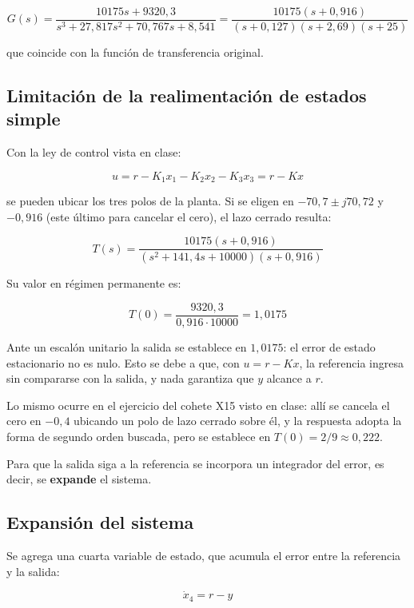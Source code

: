 \documentclass[12pt,a4paper]{article}
\begin{document}
\begin{equation}G(s)=\frac{10175s+9320{,}3}{s^3+27{,}817s^2+70{,}767s+8{,}541}=\frac{10175(s+0{,}916)}{(s+0{,}127)(s+2{,}69)(s+25)}\end{equation}

que coincide con la función de transferencia original.
\subsection*{Limitación de la realimentación de estados simple}
Con la ley de control vista en clase:

\begin{equation}u=r-K_1x_1-K_2x_2-K_3x_3=r-Kx\end{equation}

se pueden ubicar los tres polos de la planta. Si se eligen en $-70{,}7\pm j70{,}72$ y $-0{,}916$ (este último para cancelar el cero), el lazo cerrado resulta:

\begin{equation}T(s)=\frac{10175(s+0{,}916)}{(s^2+141{,}4s+10000)(s+0{,}916)}\end{equation}

Su valor en régimen permanente es:

\begin{equation}T(0)=\frac{9320{,}3}{0{,}916\cdot10000}=1{,}0175\end{equation}

Ante un escalón unitario la salida se establece en $1{,}0175$: el error de estado estacionario no es nulo. Esto se debe a que, con $u=r-Kx$, la referencia ingresa sin compararse con la salida, y nada garantiza que $y$ alcance a $r$.

Lo mismo ocurre en el ejercicio del cohete X15 visto en clase: allí se cancela el cero en $-0{,}4$ ubicando un polo de lazo cerrado sobre él, y la respuesta adopta la forma de segundo orden buscada, pero se establece en $T(0)=2/9\approx0{,}222$.

Para que la salida siga a la referencia se incorpora un integrador del error, es decir, se \textbf{expande} el sistema.
\subsection*{Expansión del sistema}
Se agrega una cuarta variable de estado, que acumula el error entre la referencia y la salida:

\begin{equation}\dot{x}_4=r-y\end{equation}
\end{document}
